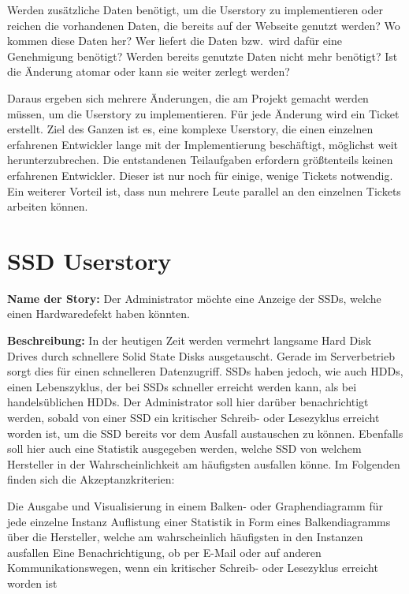 \begin{outline}
  \1 Werden zusätzliche Daten benötigt, um die Userstory zu implementieren oder
  reichen die vorhandenen Daten, die bereits auf der Webseite genutzt werden?
  \1 Wo kommen diese Daten her?
  \1 Wer liefert die Daten bzw.\ wird dafür eine Genehmigung benötigt?
  \1 Werden bereits genutzte Daten nicht mehr benötigt?
  \1 Ist die Änderung atomar oder kann sie weiter zerlegt werden?
\end{outline}

Daraus ergeben sich mehrere Änderungen, die am Projekt gemacht werden müssen,
um die Userstory zu implementieren. Für jede Änderung wird ein Ticket erstellt.
Ziel des Ganzen ist es, eine komplexe Userstory, die einen einzelnen erfahrenen
Entwickler lange mit der Implementierung beschäftigt, möglichst weit
herunterzubrechen. Die entstandenen Teilaufgaben erfordern größtenteils keinen
erfahrenen Entwickler. Dieser ist nur noch für einige, wenige Tickets
notwendig.  Ein weiterer Vorteil ist, dass nun mehrere Leute parallel an den
einzelnen Tickets arbeiten können.
\tm%

\section{SSD Userstory}
\textbf{Name der Story:} Der Administrator möchte eine Anzeige der SSDs, welche
einen Hardwaredefekt haben könnten.

\textbf{Beschreibung:} In der heutigen Zeit werden vermehrt langsame
Hard Disk Drives durch schnellere Solid State Disks ausgetauscht. Gerade im
Serverbetrieb sorgt dies für einen schnelleren Datenzugriff. SSDs haben
jedoch, wie auch HDDs, einen Lebenszyklus, der bei SSDs schneller erreicht
werden kann, als bei handelsüblichen HDDs. Der Administrator soll hier darüber
benachrichtigt werden, sobald von einer SSD ein kritischer Schreib- oder
Lesezyklus erreicht worden ist, um die SSD bereits vor dem Ausfall austauschen
zu können. Ebenfalls soll hier auch eine Statistik ausgegeben werden, welche
SSD von welchem Hersteller in der Wahrscheinlichkeit am häufigsten ausfallen
könne. Im Folgenden finden sich die Akzeptanzkriterien:

\begin{outline}
  \1 Die Ausgabe und Visualisierung in einem Balken- oder Graphendiagramm
  für jede einzelne Instanz
  \1 Auflistung einer Statistik in Form eines Balkendiagramms über die
  Hersteller, welche am wahrscheinlich häufigsten in den Instanzen ausfallen
  \1 Eine Benachrichtigung, ob per E\hyp{}Mail oder auf anderen
  Kommunikationswegen, wenn ein kritischer Schreib- oder Lesezyklus erreicht
  worden ist
\end{outline}

